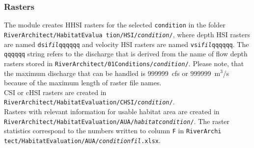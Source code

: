 \subsubsection{Rasters}\label{sec:heoutputhhsi}
The module creates HHSI rasters for the selected \texttt{condition} in the folder \texttt{RiverArchitect/HabitatEvalua tion/HSI/\textit{condition}/}, where depth HSI rasters are named \texttt{dsi{\myUnderscore}\textit{fil}qqqqqq} and velocity HSI rasters are named \texttt{vsi{\myUnderscore}\textit{fil}qqqqqq}. The \texttt{qqqqqq} string refers to the discharge that is derived from the name of flow depth rasters stored in \texttt{RiverArchitect/01{\myUnderscore}Conditions/\textit{condition}/}. Please note, that the maximum discharge that can be handled is 999999~cfs or 999999~m$^3$/s because of the maximum length of raster file names.\\
CSI or cHSI rasters are created in \texttt{RiverArchitect/HabitatEvaluation/CHSI/\textit{condition}/}.\\
Rasters with relevant information for usable habitat area are created in \texttt{RiverArchitect/HabitatEvaluation/AUA/\textit{habitat{\myUnderscore}condition}/}. The raster statistics correspond to the numbers written to column \texttt{F} in \texttt{RiverArchi tect/HabitatEvaluation/AUA/\textit{condition}{\myUnderscore}\textit{fil}.xlsx}.\\


